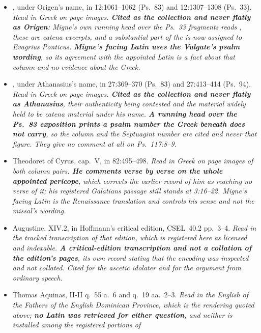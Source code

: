 \begin{itemize}[leftmargin=1.2em, itemsep=0.15em]
{psalm homilies was consulted.}
\item {}, under Origen's name, in  12:1061--1062 (Ps.~83) and 12:1307--1308 (Ps.~33). \textit{Read in
Greek on page images. \textbf{Cited as the collection and never flatly as
Origen}: Migne's own running head over the Ps.~33 fragments reads , these are catena excerpts, and a substantial part of the
 is now assigned to Evagrius Ponticus. \textbf{Migne's facing
Latin uses the Vulgate's psalm wording}, so its agreement with the appointed
Latin is a fact about that column and no evidence about the Greek.}
\item {}, under Athanasius's name, in
 27:369--370 (Ps.~83) and 27:413--414 (Ps.~94).
\textit{Read in Greek on page images. \textbf{Cited as the collection and never
flatly as Athanasius}, their authenticity being contested and the material
widely held to be catena material under his name. \textbf{A running head over
the Ps.~83 exposition prints a psalm number the Greek beneath does not carry},
so the column and the Septuagint number are cited and never that figure. They
give no comment at all on Ps.~117:8--9.}
\item Theodoret of Cyrus,  cap.~V, in
 82:495--498. \textit{Read in Greek on page images of
both column pairs. \textbf{He comments verse by verse on the whole appointed
pericope}, which corrects the earlier record of him as reaching no verse of it;
his registered Galatians passage still stands at 3:16--22. Migne's facing Latin
is the Renaissance translation and controls his sense and not the missal's
wording.}
\item Augustine,  XIV.2, in Hoffmann's critical edition,
CSEL~40.2 pp.~3--4. \textit{Read in the tracked transcription of that edition,
which is registered here as licensed and indexable. \textbf{A critical-edition
transcription and not a collation of the edition's pages}, its own record
stating that the encoding was inspected and not collated. Cited for the ascetic
idolater and for the argument from ordinary speech.}
\item Thomas Aquinas,  II-II q.~55 a.~6 and q.~19
aa.~2--3. \textit{Read in the English of the Fathers of the English Dominican
Province, which is the rendering quoted above; \textbf{no Latin was retrieved
for either question}, and neither is installed among the registered portions of
}
\end{itemize}
